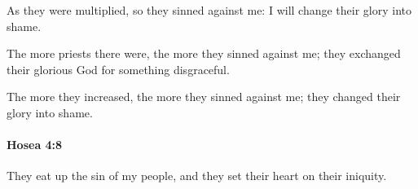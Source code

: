 			\begin{versebox}
					\item[BHS] 
					\item[LXX] 
					\item[ASV] As they were multiplied, so they sinned against me: I will change their glory into shame.
					\item[NIV] The more priests there were, the more they sinned against me; they exchanged their glorious God for something disgraceful.
					\item[NRSV] The more they increased, the more they sinned against me; they changed their glory into shame.
			\end{versebox}

		\paragraph{Hosea 4:8} %
			\label{HOSEA-4-8}

			They eat up the sin of my people, and they set their heart on their iniquity.

